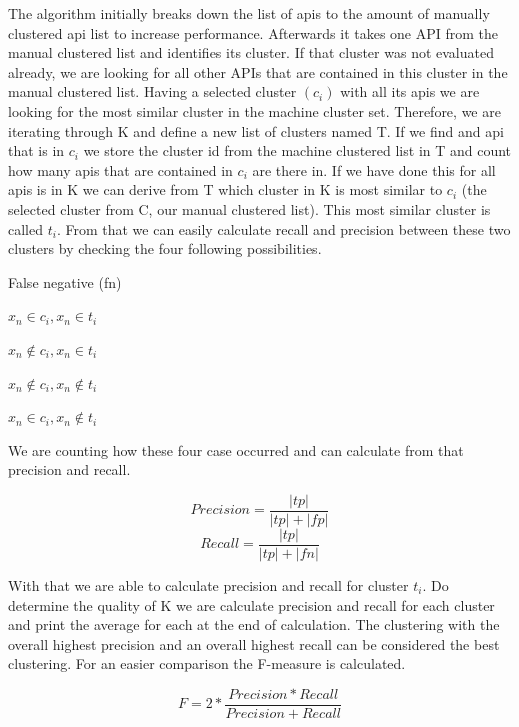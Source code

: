\documentclass[a4paper]{IEEEtran}
\begin{document}
The algorithm initially breaks down the list of apis to the amount of manually clustered api list to increase performance. 
Afterwards it takes one API from the manual clustered list and identifies its cluster. If that cluster was not evaluated already, we are looking for all other APIs that are contained in this cluster in the manual clustered list. Having a selected cluster $(c_i)$ with all its apis we are looking for the most similar cluster in the machine cluster set. Therefore, we are iterating through K and define a new list of clusters named T. If we find and api that is in $c_i$ we store the cluster id from the machine clustered list in T and count how many apis that are contained in $c_i$ are there in. If we have done this for all apis is in K we can derive from T which cluster in K is most similar to $c_i$ (the selected cluster from C, our manual clustered list). This most similar cluster is called $t_i$. From that we can easily calculate recall and precision between these two clusters by checking the four following possibilities.

\begin{labeling}{False negative (fn)}
\centering \item  [True positive (tp)] $x_n \in c_i,x_n \in t_i$
\item [False positive (fp)] $x_n \notin c_i,x_n \in t_i$
\item [True negative (tn)] $x_n \notin c_i,x_n \notin t_i$
\item [False negative (fn)] $x_n \in c_i,x_n \notin t_i$
\end{labeling}

We are counting how these four case occurred and can calculate from that precision and recall. 

\begin{equation*}
Precision= \frac{|tp|}{|tp|+|fp|}
\end{equation*}
\begin{equation*}
Recall= \frac{|tp|}{|tp|+|fn|}
\end{equation*}

With that we are able to calculate precision and recall for cluster $t_i$. Do determine the quality of K we are calculate precision and recall for each cluster and print the average for each at the end of calculation. The clustering with the overall highest precision and an overall highest recall can be considered the best clustering. For an easier comparison the F-measure is calculated. 

\begin{equation*}
F=2* \frac{Precision*Recall}{Precision+Recall}
\end{equation*}
\end{document}
